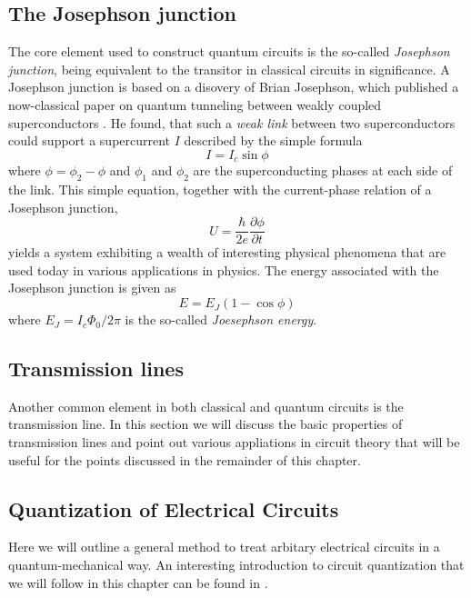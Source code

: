 \subsection{The Josephson junction}

The core element used to construct quantum circuits is the so-called {\it Josephson junction}, being equivalent to the transitor in classical circuits in significance. A Josephson junction is based on a disovery of Brian Josephson, which published a now-classical paper on quantum tunneling between weakly coupled superconductors \citep{josephson_possible_1962}. He found, that such a {\it weak link} between two superconductors could support a supercurrent $I$ described by the simple formula
%
\begin{equation}
I = I_c\sin{\phi}
\end{equation}
%
where $\phi = \phi_2-\phi$ and $\phi_1$ and $\phi_2$ are the superconducting phases at each side of the link. This simple equation, together with the current-phase relation of a Josephson junction,
%
\begin{equation}
U = \frac{\hbar}{2e}\frac{\partial \phi}{\partial t}
\end{equation}
%
yields a system exhibiting a  wealth of interesting physical phenomena that are used today in various applications in physics. The energy associated with the Josephson junction is given as
%
\begin{equation}
E = E_J(1-\cos{\phi})
\end{equation}
%
where $E_J = I_c \Phi_0/2\pi$ is the so-called {\it Joesephson energy}.

\subsection{Transmission lines}

Another common element in both classical and quantum circuits is the transmission line. In this section we will discuss the basic properties of transmission lines and point out various appliations in circuit theory that will be useful for the points discussed in the remainder of this chapter.

\subsection{Quantization of Electrical Circuits}

Here we will outline a general method to treat arbitary electrical circuits in a quantum-mechanical way. An interesting introduction to circuit quantization that we will follow in this chapter can be found in \cite{devoret_quantum_1995}.

